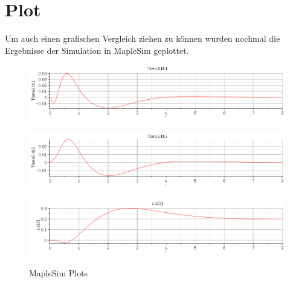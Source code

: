 \documentclass[a4paper, 10pt]{report}
\begin{document}
\section{Plot}
Um auch einen grafischen Vergleich ziehen zu können wurden nochmal die Ergebnisse der Simulation in MapleSim geplottet. 

\begin{figure}[h]
\centering  %
\label{Auslenkung th1}
\includegraphics[width=\textwidth]{th1}
\end{figure}
\begin{figure}[h]
	\centering  %
	\label{Auslenkung th2}
	\includegraphics[width=\textwidth]{th2}
\end{figure}
\begin{figure}[h]
	\centering  %
	\label{Auslenkung x}
	\includegraphics[width=\textwidth]{x}
	\caption{MapleSim Plots}
\end{figure}
\end{document}
